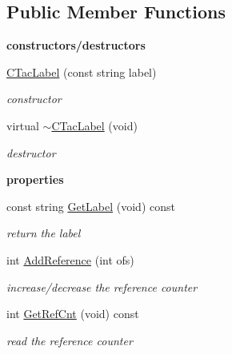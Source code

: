 \subsection*{Public Member Functions}
\begin{Indent}{\bf constructors/destructors}\par
\begin{DoxyCompactItemize}
\item 
\hyperlink{classCTacLabel_aed5a63290b9d021575e612b05148f394}{C\-Tac\-Label} (const string label)
\begin{DoxyCompactList}\small\item\em constructor \end{DoxyCompactList}\item 
\hypertarget{classCTacLabel_ae24f9fbeb13c2bf40cade0f97b743ad2}{virtual \hyperlink{classCTacLabel_ae24f9fbeb13c2bf40cade0f97b743ad2}{$\sim$\-C\-Tac\-Label} (void)}\label{classCTacLabel_ae24f9fbeb13c2bf40cade0f97b743ad2}

\begin{DoxyCompactList}\small\item\em destructor \end{DoxyCompactList}\end{DoxyCompactItemize}
\end{Indent}
\begin{Indent}{\bf properties}\par
\begin{DoxyCompactItemize}
\item 
\hypertarget{classCTacLabel_ae26763701f58d009b5332f91885489af}{const string \hyperlink{classCTacLabel_ae26763701f58d009b5332f91885489af}{Get\-Label} (void) const }\label{classCTacLabel_ae26763701f58d009b5332f91885489af}

\begin{DoxyCompactList}\small\item\em return the label \end{DoxyCompactList}\item 
\hypertarget{classCTacLabel_a9be168903219c7915ae3a79947f5480e}{int \hyperlink{classCTacLabel_a9be168903219c7915ae3a79947f5480e}{Add\-Reference} (int ofs)}\label{classCTacLabel_a9be168903219c7915ae3a79947f5480e}

\begin{DoxyCompactList}\small\item\em increase/decrease the reference counter \end{DoxyCompactList}\item 
\hypertarget{classCTacLabel_ac5a317f7e9707ca821d362a1b2e62fa6}{int \hyperlink{classCTacLabel_ac5a317f7e9707ca821d362a1b2e62fa6}{Get\-Ref\-Cnt} (void) const }\label{classCTacLabel_ac5a317f7e9707ca821d362a1b2e62fa6}

\begin{DoxyCompactList}\small\item\em read the reference counter \end{DoxyCompactList}\end{DoxyCompactItemize}
\end{Indent}
